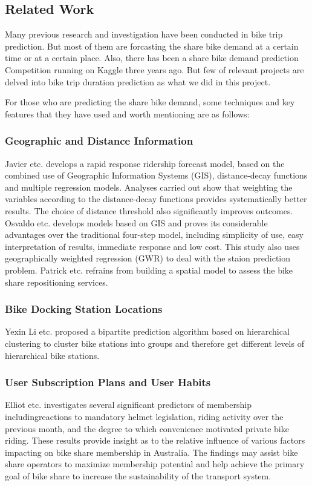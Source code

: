 \subsection{Related Work}
\par Many previous research and investigation have been conducted in bike trip prediction. But most of them are forcasting the share bike demand at a certain time or at a certain place. Also, there has been a share bike demand prediction Competition running on Kaggle three years ago. But few of relevant projects are delved into bike trip duration prediction as what we did in this project.
\par For those who are predicting the share bike demand, some techniques and key features that they have used and worth mentioning are as follows:

\subsubsection{Geographic and Distance Information}
Javier etc.\cite{gu} develops a rapid response ridership forecast model, based on the combined use of Geographic Information Systems (GIS), distance-decay functions and multiple regression models. Analyses carried out show that weighting the variables according to the distance-decay functions provides systematically better results. The choice of distance threshold also significantly improves outcomes. Osvaldo etc. \cite{car} develops models based on GIS and proves its considerable advantages over the traditional four-step model, including simplicity of use, easy interpretation of results, immediate response and low cost. This study also uses geographically weighted regression (GWR) to deal with the staion prediction problem. Patrick etc.\cite{vogel} refrains from building a spatial model to assess the bike share repositioning services.

\subsubsection{Bike Docking Station Locations}
\par Yexin Li etc.\cite{Li} proposed a bipartite prediction algorithm based on hierarchical clustering to cluster bike stations into groups and therefore get different levels of hierarchical bike stations.

\subsubsection{User Subscription Plans and User Habits}
Elliot etc.\cite{fish} investigates several significant predictors of membership includingreactions to mandatory helmet legislation, riding activity over the previous month, and the degree to which convenience motivated private bike riding. These results provide insight as to the relative influence of various factors impacting on bike share membership in Australia. The findings may assist bike share operators to maximize membership potential and help achieve the primary goal of bike share to increase the sustainability of the transport system.

